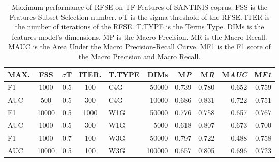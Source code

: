 \documentclass[runningheads]{llncs}
\begin{document}
\begin{table}
\center
\begin{tabular}{|l|ccc|lr|rrrr|}
\hline
MAX. & FSS & $\sigma$T & ITER. & T.TYPE & DIMs & M\emph{P} & M\emph{R} & M\emph{AUC} & M\emph{F1} \\
\hline
F1 & 1000 & 0.5 & 100 & C4G & 50000 & 0.739 & 0.780 & 0.652 & 0.759 \\
AUC & 500 & 0.5 & 300 & C4G & 10000 & 0.686 & 0.831 & 0.722 & 0.751 \\
F1 & 10000 & 0.5 & 1000 & W1G & 50000 & 0.776 & 0.758 & 0.657 & 0.767 \\
AUC & 1000 & 0.5 & 300 & W1G & 5000 & 0.618 & 0.807 & 0.673 & 0.700 \\
F1 & 1000 & 0.7 & 100 & W3G & 50000 & 0.797 & 0.722 & 0.488 & 0.758 \\
AUC & 10000 & 0.5 & 100 & W3G & 100000 & 0.657 & 0.805 & 0.696 & 0.723 \\
\hline
\end{tabular}
\caption {Maximum performance of RFSE on TF Features of SANTINIS coprus. FSS is the Features Subset Selection number. $\sigma$T is the sigma threshold of the RFSE. ITER is the number of iterations of the RFSE. T.TYPE is the Terms Type. DIMs is the features model's dimensions. MP is the Macro Precision. MR is the Macro Recall. MAUC is the Area Under the Macro Precision-Recall Curve. MF1 is the F1 score of the Macro Precision and Macro Recall.}
\label{tbl:RFSE_TF}
\vspace{-15mm}
\end{table}
\end{document}
